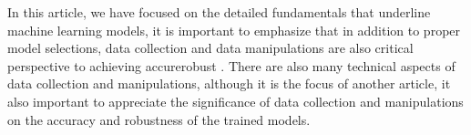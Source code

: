 
\par
In this article, we have focused on the detailed fundamentals that underline machine learning models, it is important to emphasize that in addition to proper model selections, data collection and data manipulations are also critical perspective to achieving accurerobust . There are also many technical aspects of data collection and manipulations, although it is the focus of another article, it also important to appreciate the significance of data collection and manipulations on the accuracy and robustness of the trained models.
\par 
